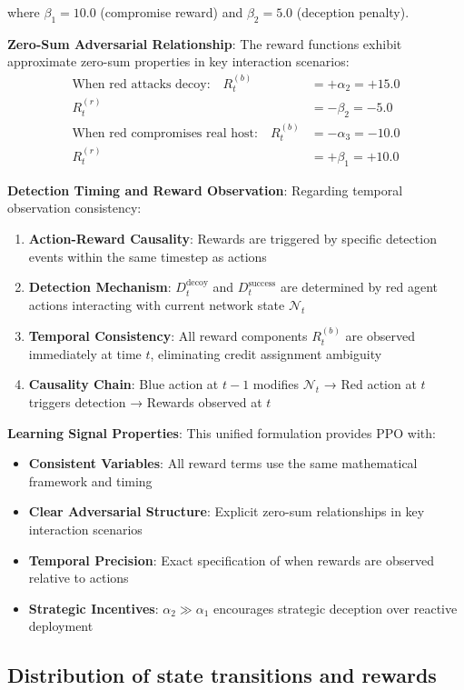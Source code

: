 \documentclass[12pt,oneside,a4paper]{article}
\theoremstyle{definition}
\theoremstyle{plain}
\begin{document}
where $\beta_1 = 10.0$ (compromise reward) and $\beta_2 = 5.0$ (deception penalty).

\textbf{Zero-Sum Adversarial Relationship}:
The reward functions exhibit approximate zero-sum properties in key interaction scenarios:
\begin{align}
\text{When red attacks decoy:} \quad R_t^{(b)} &= +\alpha_2 = +15.0 \\
R_t^{(r)} &= -\beta_2 = -5.0 \\
\text{When red compromises real host:} \quad R_t^{(b)} &= -\alpha_3 = -10.0 \\
R_t^{(r)} &= +\beta_1 = +10.0
\end{align}

\textbf{Detection Timing and Reward Observation}:
Regarding temporal observation consistency:
\begin{enumerate}
\item \textbf{Action-Reward Causality}: Rewards are triggered by specific detection events within the same timestep as actions
\item \textbf{Detection Mechanism}: $D_t^{\text{decoy}}$ and $D_t^{\text{success}}$ are determined by red agent actions interacting with current network state $\mathcal{N}_t$
\item \textbf{Temporal Consistency}: All reward components $R_t^{(b)}$ are observed immediately at time $t$, eliminating credit assignment ambiguity
\item \textbf{Causality Chain}: Blue action at $t-1$ modifies $\mathcal{N}_t$ → Red action at $t$ triggers detection → Rewards observed at $t$
\end{enumerate}

\textbf{Learning Signal Properties}:
This unified formulation provides PPO with:
\begin{itemize}
\item \textbf{Consistent Variables}: All reward terms use the same mathematical framework and timing
\item \textbf{Clear Adversarial Structure}: Explicit zero-sum relationships in key interaction scenarios
\item \textbf{Temporal Precision}: Exact specification of when rewards are observed relative to actions
\item \textbf{Strategic Incentives}: $\alpha_2 \gg \alpha_1$ encourages strategic deception over reactive deployment
\end{itemize}

\subsection{Distribution of state transitions and rewards}
\end{document}
